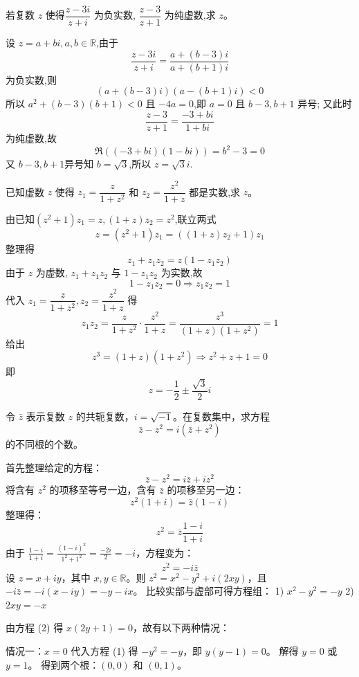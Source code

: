 \begin{questions}
    \question 若复数 $z$ 使得$\dfrac{z-3i}{z+i}$ 为负实数, $\dfrac{z-3}{z+1}$ 为纯虚数,求 $z$。
    \begin{solution}
        设 $z=a+bi,a,b\in \mathbb{R}$,由于 
        \[
        \frac{z-3i}{z+i}=\frac{a+(b-3)i}{a+(b+1)i}
        \]
        为负实数,则 
        \[
        (a+(b-3)i)(a-(b+1)i)<0
        \]
        所以 $a^{2}+(b-3)(b+1)<0$ 且 $-4a=0$,即 $a=0$ 且 $b-3,b+1$ 异号; 又此时
        \[
        \frac{z-3}{z+1}=\frac{-3+bi}{1+bi}
        \]
        为纯虚数,故 
        \[
        \Re((-3+bi)(1-bi))=b^{2}-3=0
        \]
        又 $b-3,b+1$异号知 $b=\sqrt{3}$,所以 $z=\sqrt{3}i$.
    \end{solution}
    
    \question  已知虚数 $z$ 使得 $z_1 = \dfrac{z}{1+z^2}$ 和 $z_2 = \dfrac{z^2}{1+z}$ 都是实数,求 $z$。
    \begin{solution}
        由已知$(z^2 + 1)z_1 = z, (1 + z)z_2 = z^2$,联立两式
        \[
        z = (z^2 + 1)z_1 = ((1+z)z_2 + 1)z_1
        \]
        整理得
        \[
        z_1 + z_1 z_2 = z(1 - z_1 z_2)
        \]
        由于 $z$ 为虚数, $z_1 + z_1 z_2$ 与 $1 - z_1 z_2$ 为实数,故
        \[
        1 - z_1 z_2 = 0 \Rightarrow z_1 z_2 = 1
        \]
        代入 $z_1 = \dfrac{z}{1 + z^2},z_2 = \dfrac{z^2}{1 + z}$ 得
        \[
        z_1 z_2 = \frac{z}{1+z^2} \cdot \frac{z^2}{1+z} = \frac{z^3}{(1+z)(1+z^2)} = 1
        \]
        给出
        \[
        z^3 = (1+z)(1+z^2)
        \Rightarrow z^2 + z + 1 = 0
        \]
        即
        \[
        z = -\frac{1}{2} \pm \frac{\sqrt{3}}{2}i
        \]
    \end{solution}

    \question
令 $\bar{z}$ 表示复数 $z$ 的共轭复数，$i = \sqrt{-1}$。在复数集中，求方程
\[
\bar{z} - z^2 = i(\bar{z} + z^2)
\]
的不同根的个数。

\begin{solution}
首先整理给定的方程：
\[
\bar{z} - z^2 = i\bar{z} + iz^2
\]
将含有 $z^2$ 的项移至等号一边，含有 $\bar{z}$ 的项移至另一边：
\[
z^2(1 + i) = \bar{z}(1 - i)
\]
整理得：
\[
z^2 = \bar{z} \frac{1 - i}{1 + i}
\]
由于 $\frac{1 - i}{1 + i} = \frac{(1 - i)^2}{1^2 + 1^2} = \frac{-2i}{2} = -i$，方程变为：
\[
z^2 = -i\bar{z}
\]
设 $z = x + iy$，其中 $x, y \in \mathbb{R}$。则 $z^2 = x^2 - y^2 + i(2xy)$，且 $-i\bar{z} = -i(x - iy) = -y - ix$。
比较实部与虚部可得方程组：
1) $x^2 - y^2 = -y$
2) $2xy = -x$

由方程 (2) 得 $x(2y + 1) = 0$，故有以下两种情况：

情况一：$x = 0$
代入方程 (1) 得 $-y^2 = -y$，即 $y(y - 1) = 0$。
解得 $y = 0$ 或 $y = 1$。
得到两个根：$(0, 0)$ 和 $(0, 1)$。


\end{solution}
\end{questions}
